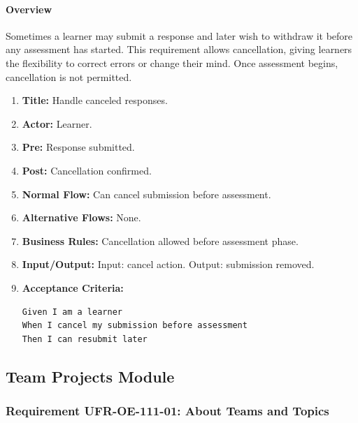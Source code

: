 \paragraph{Overview}
Sometimes a learner may submit a response and later wish to withdraw it before any assessment has started. This requirement allows cancellation, giving learners the flexibility to correct errors or change their mind. Once assessment begins, cancellation is not permitted.
\begin{enumerate}[label=\textbf{\arabic*.}]
\item \textbf{Title:} Handle canceled responses.
\item \textbf{Actor:} Learner.
\item \textbf{Pre:} Response submitted.
\item \textbf{Post:} Cancellation confirmed.
\item \textbf{Normal Flow:} Can cancel submission before assessment.
\item \textbf{Alternative Flows:} None.
\item \textbf{Business Rules:} Cancellation allowed before assessment phase.
\item \textbf{Input/Output:} Input: cancel action. Output: submission removed.
\item \textbf{Acceptance Criteria:}
    \begin{verbatim}
Given I am a learner
When I cancel my submission before assessment
Then I can resubmit later
    \end{verbatim}
\end{enumerate}

\subsection{Team Projects Module}
\subsubsection{Requirement UFR-OE-111-01: About Teams and Topics}
